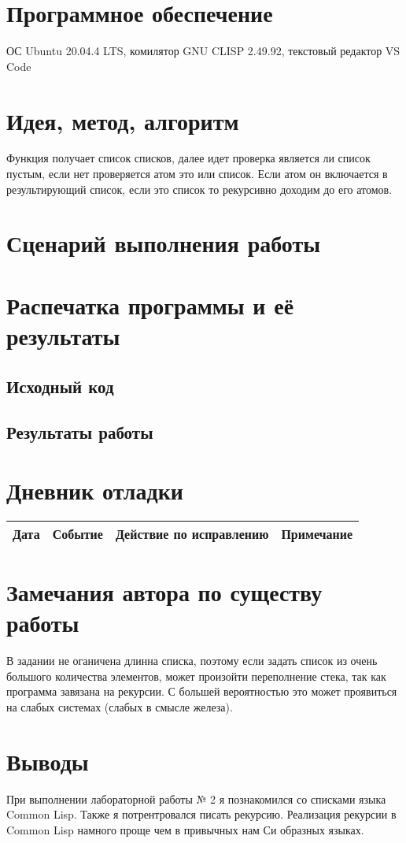 \documentclass[12pt]{article}
\begin{document}
\section{Программное обеспечение}
ОС Ubuntu 20.04.4 LTS, комилятор GNU CLISP 2.49.92, текстовый редактор VS Code

\pagebreak
\section{Идея, метод, алгоритм}
Функция получает список списков, далее идет проверка является ли список пустым, если нет проверяется атом это или список. Если атом он включается в результирующий список, если это список то рекурсивно доходим до его атомов.

\section{Сценарий выполнения работы}

\section{Распечатка программы и её результаты}

\subsection{Исходный код}


\pagebreak
\subsection{Результаты работы}


\pagebreak
\section{Дневник отладки}
\begin{tabular}{|p{50pt}|p{80pt}|p{140pt}|p{140pt}|}
\hline
Дата & Событие & Действие по исправлению & Примечание \\
\hline
\end{tabular}

\section{Замечания автора по существу работы}
В задании не оганичена длинна списка, поэтому если задать список из очень большого количества элементов, может произойти переполнение стека, так как программа завязана на рекурсии. С большей вероятностью это может проявиться на слабых системах (слабых в смысле железа).


\section{Выводы}
При выполнении лабораторной работы № 2 я познакомился со списками языка Common Lisp. Также я потрентровался писать рекурсию. Реализация рекурсии в Common Lisp намного проще чем в привычных нам Си образных языках.
\end{document}

